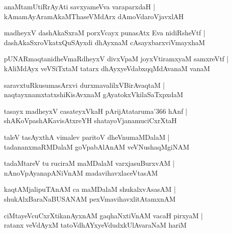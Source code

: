 \documentclass[twoside,12pt,openright]{book}
\newcounter{shloka}[chapter]
\begin{document}
\begin{shloka}%
anaMtamUtiRrAyAti savxyameVva varaparxdaH |\\
kAmamAyAramAkaMThaseVMdArx dAmoVdaroVjavxlAH
\end{shloka}

\begin{shloka}%
madheyxV dashAkaSxraM porxVcayx punasAtx Eva nidiRsheVtf |\\
dashAkaSxroVkatxQuSAyxdi dhAyxnaM cAsayxbarxviVmayxhaM 
\end{shloka}

\begin{shloka}%
pUNARmaqtanidheVmaRdheyxV divxVpaM joyxVtiramxyaM samxreVtf |\\
kAliMdAyx veVSiTxtaM tatarx dhAyxyeVdabxqqMdAvanaM vanaM 
\end{shloka}

\begin{shloka}%
saravxtuRkusumasArxvi durxmavalilxVBirAvaqtaM |\\
naqtayxnamxtatxshiKisAvxnaM gAyatokxVkilaSaTxpxdaM 
\end{shloka}

\begin{shloka}%
tasayx madheyxV casateyxVkaH pArijAtataruma\char'366 hAnf |\\
shAKoVpashAKavisAtxreYH shatayoVjanamuciCxrXtaH 
\end{shloka}

\begin{shloka}%
taleV tasAyxthA vimalev paritoV dheVnumaMDalaM |\\
tadananxmaRMDalaM goVpabAlAnAM veVNushaqMgiNAM 
\end{shloka}

\begin{shloka}%
tadaMtareV tu ruciraM maMDalaM varxjasuBurxvAM |\\
nAnoVpAyanapANiVnAM madavihavxlaceVtasAM 
\end{shloka}

\begin{shloka}%
kaqtAMjalipuTAnAM ca maMDalaM shukalxvAsasAM |\\
shukAlxBaraNaBUSANAM pexVmavihavxlitAtamxnAM
\end{shloka}

\begin{shloka}%
ciMtayeVcuCxrXtikanAyxnAM gaqhaNxtiVnAM vacaH pirxyaM |\\
ratanx veVdAyxM tatoVdhAYxyeVdudxkUlAvaraNaM hariM 
\end{shloka}
\end{document}
